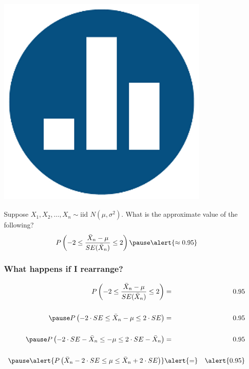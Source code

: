 \documentclass[handout]{beamer}
\begin{document}
\begin{frame}
\frametitle{\includegraphics[scale = 0.05]{./images/clicker}}
Suppose $X_1, X_2, \hdots, X_n \sim \mbox{iid } N(\mu,\sigma^2)$. What is the approximate value of the following?
$$P\left(-2 \leq \frac{\bar{X}_n - \mu}{SE(\bar{X}_n)} \leq 2 \right)\pause \alert{\approx 0.95}$$

\end{frame}

\begin{frame}
\frametitle{What happens if I rearrange?}
	\begin{eqnarray*}
		P\left(-2 \leq \frac{\bar{X}_n - \mu}{SE(\bar{X}_n)} \leq 2 \right) &=& 0.95\\ \\ \pause
			P\left(-2\cdot SE\leq \bar{X}_n - \mu \leq 2 \cdot SE\right) &=& 0.95\\ \\ \pause
			P\left(-2\cdot SE - \bar{X}_n \leq - \mu \leq 2 \cdot SE - \bar{X}_n \right) &=& 0.95\\ \\ \pause
			\alert{P\left( \bar{X}_n - 2\cdot SE \leq \mu \leq \bar{X}_n + 2\cdot SE \right)}&\alert{=}& \alert{0.95}
	\end{eqnarray*}

\end{frame}

\end{document}
